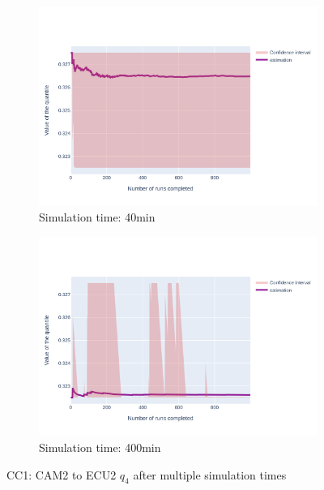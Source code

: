 \documentclass{article}
\begin{document}
\begin{figure}[H]
\begin{subfigure}{.495\textwidth}
        \vspace{.5cm}
    \end{subfigure}
    \begin{subfigure}{.495\textwidth}
        \centering
        \includegraphics[width=\textwidth]{../fig/quantile4/CC1: CAM2 --> ECU2_40mn.png}
        \caption{Simulation time: 40min}
    \end{subfigure}
    \begin{subfigure}{.495\textwidth}
        \centering
        \includegraphics[width=\textwidth]{../fig/quantile4/CC1: CAM2 --> ECU2_400mn.png}
        \caption{Simulation time: 400min}
    \end{subfigure}
    \caption{CC1: CAM2 to ECU2 $q_4$ after multiple simulation times}
\end{figure}
\end{document}
